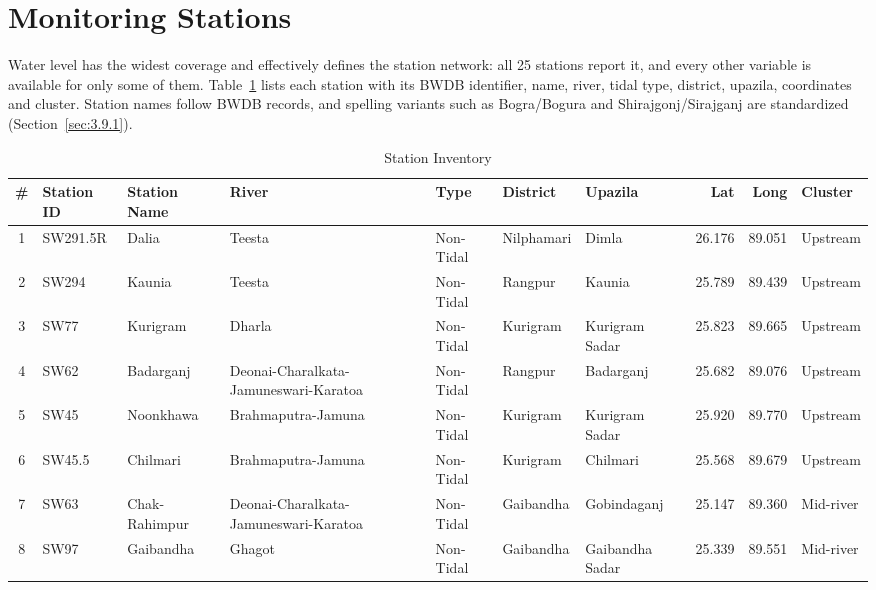 \section{Monitoring Stations}
\label{sec:3.5}

Water level has the widest coverage and effectively defines the station
network: all 25 stations report it, and every other variable is available for
only some of them. Table~\ref{tab:3.1} lists each station with its BWDB
identifier, name, river, tidal type, district, upazila, coordinates and
cluster. Station names follow BWDB records, and spelling variants such as
Bogra/Bogura and Shirajgonj/Sirajganj are standardized
(Section~\ref{sec:3.9.1}).

\begin{landscape}
\begin{table}[htbp]
  \centering
  \caption{Station Inventory}
  \label{tab:3.1}
  \scriptsize
  \setlength{\tabcolsep}{3pt}
  \begin{tabularx}{\linewidth}{@{}c l X X l X X r r l@{}}
    \toprule
    \textbf{\#} & \textbf{Station ID} & \textbf{Station Name} & \textbf{River} & \textbf{Type} &
    \textbf{District} & \textbf{Upazila} & \textbf{Lat} & \textbf{Long} & \textbf{Cluster} \\
    \midrule
    1 & SW291.5R & Dalia & Teesta & Non-Tidal & Nilphamari & Dimla & 26.176 & 89.051 & Upstream \\
    2 & SW294 & Kaunia & Teesta & Non-Tidal & Rangpur & Kaunia & 25.789 & 89.439 & Upstream \\
    3 & SW77 & Kurigram & Dharla & Non-Tidal & Kurigram & Kurigram Sadar & 25.823 & 89.665 & Upstream \\
    4 & SW62 & Badarganj & Deonai-Charalkata-Jamuneswari-Karatoa & Non-Tidal & Rangpur & Badarganj & 25.682 & 89.076 & Upstream \\
    5 & SW45 & Noonkhawa & Brahmaputra-Jamuna & Non-Tidal & Kurigram & Kurigram Sadar & 25.920 & 89.770 & Upstream \\
    6 & SW45.5 & Chilmari & Brahmaputra-Jamuna & Non-Tidal & Kurigram & Chilmari & 25.568 & 89.679 & Upstream \\
    7 & SW63 & Chak-Rahimpur & Deonai-Charalkata-Jamuneswari-Karatoa & Non-Tidal & Gaibandha & Gobindaganj & 25.147 & 89.360 & Mid-river \\
    8 & SW97 & Gaibandha & Ghagot & Non-Tidal & Gaibandha & Gaibandha Sadar & 25.339 & 89.551 & Mid-river \\

\end{tabularx}
\end{table}
\end{landscape}
